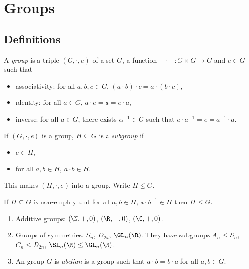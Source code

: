 \documentclass[a4paper]{article}
\theoremstyle{definition}
\begin{document}


\tableofcontents

\section{Groups}

\subsection{Definitions}

\begin{definition}[Group]
  A \emph{group} is a triple \((G, \cdot, e)\) of a set \(G\), a function \(- \cdot -: G \times G \to G\) and \(e \in G\) such that
  \begin{itemize}
  \item associativity: for all \(a, b, c \in G\), \((a \cdot b) \cdot c = a \cdot (b \cdot c)\),
  \item identity: for all \(a \in G\), \(a \cdot e = a = e \cdot a\),
  \item inverse: for all \(a \in G\), there exists \(\alpha^{-1} \in G\) such that \(a \cdot a^{-1} = e = a^{-1} \cdot a\).
  \end{itemize}
\end{definition}

\begin{definition}[Subgroup]
  If \((G, \cdot, e)\) is a group, \(H \subseteq G\) is a \emph{subgroup} if
  \begin{itemize}
  \item \(e \in H\),
  \item for all \(a, b \in H\), \(a \cdot b \in H\).
  \end{itemize}
  This makes \((H, \cdot, e)\) into a group. Write \(H \leq G\).
\end{definition}

\begin{lemma}
  If \(H \subseteq G\) is non-emphty and for all \(a, b \in H\), \(a \cdot b^{-1} \in H\) then \(H \leq G\).
\end{lemma}

\begin{eg}\leavevmode
  \begin{enumerate}
  \item Additive groups: \((\N, +, 0)\), \((\R, +, 0)\), \((\C, +, 0)\).
  \item Groups of symmetries: \(S_n\), \(D_{2n}\), \(\GL_n(\R)\). They have subgroups \(A_n \leq S_n\), \(C_n \leq D_{2n}\), \(\SL_n(\R) \leq \GL_n(\R)\).
  \item An group \(G\) is \emph{abelian} is a group such that \(a \cdot b = b \cdot a\) for all \(a, b \in G\).
  \end{enumerate}
\end{eg}
\end{document}
